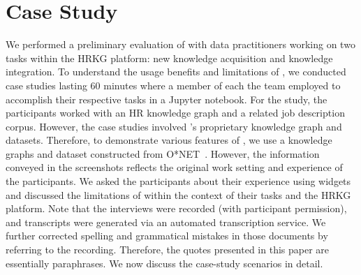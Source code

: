 \section{Case Study}
\label{sec:study}
We performed a preliminary evaluation of \system with data practitioners working on two tasks within the HRKG platform: new knowledge acquisition and knowledge integration.  
To understand the usage benefits and limitations of \system, 
we conducted case studies lasting 60 minutes where a member of each
the team employed \system to accomplish their respective tasks in a Jupyter notebook.
For the study, the participants worked with an HR knowledge graph and a related job description corpus. However, the case studies involved \company's proprietary knowledge graph and datasets. Therefore, to demonstrate various features of \system, we use a knowledge graphs and dataset constructed from O*NET~\cite{peterson1999occupational}. However, the information conveyed in the screenshots reflects the original work setting and experience of the participants.
We asked the participants about their experience using \system widgets and discussed the limitations of \system within the context of their tasks and the HRKG platform. Note that the interviews were recorded (with participant permission), and transcripts were generated via an automated transcription service. We further corrected spelling and grammatical mistakes in those documents by referring to the recording. Therefore, the quotes presented in this paper are essentially paraphrases. We now discuss the case-study scenarios in detail.
 

